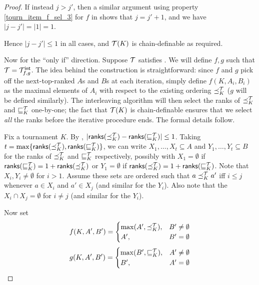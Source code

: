 \begin{proof}
    If instead $j > j'$, then a similar argument using property
    \cref{tourn_item_f_sel_3} for $f$ in  shows
    that $j = j' + 1$, and we have $|j - j'| = |1| = 1$.

    Hence $|j - j'| \le 1$ in all cases, and $\mathcal{T}(K)$ is chain-definable as
    required.

    Now for the ``only if'' direction. Suppose $\mathcal{T}$ satisfies
    \chaindef{}. We will define $f, g$ such that $\mathcal{T} = {\mathcal{T}_{f,g}^\mathsf{int}}$.
    The idea behind the construction is straightforward: since $f$ and $g$ pick
    off the next-top-ranked $A$s and $B$s at each iteration, simply define
    $f(K, A_i, B_i)$ as the maximal elements of $A_i$ with respect to the
    existing ordering ${\preceq_K^{\mathcal{T}}}$ ($g$ will be defined similarly). The
    interleaving algorithm will then select the ranks of ${\preceq_K^{\mathcal{T}}}$ and
    ${\sqsubseteq_K^{\mathcal{T}}}$ one-by-one; the fact that $\mathcal{T}(K)$ is chain-definable
    ensures that we select \emph{all} the ranks before the iterative procedure
    ends. The formal details follow.

    Fix a tournament $K$. By ,
    $|\mathsf{ranks}({{\preceq_K^{\mathcal{T}}}}) - \mathsf{ranks}({{\sqsubseteq_K^{\mathcal{T}}}})| \le 1$. Taking $t =
    \max\{\mathsf{ranks}({{\preceq_K^{\mathcal{T}}}}), \mathsf{ranks}({{\sqsubseteq_K^{\mathcal{T}}}})\}$, we can write $X_1,
    \ldots, X_t \subseteq A$ and $Y_1, \ldots, Y_t \subseteq B$ for the ranks
    of ${\preceq_K^{\mathcal{T}}}$ and ${\sqsubseteq_K^{\mathcal{T}}}$ respectively, possibly with $X_1 =
    \emptyset$ if $\mathsf{ranks}({{\sqsubseteq_K^{\mathcal{T}}}}) = 1 + \mathsf{ranks}({{\preceq_K^{\mathcal{T}}}})$ or $Y_1 =
    \emptyset$ if $\mathsf{ranks}({{\preceq_K^{\mathcal{T}}}}) = 1 + \mathsf{ranks}({{\sqsubseteq_K^{\mathcal{T}}}})$. Note
    that $X_i, Y_i \ne \emptyset$ for $i > 1$. Assume these sets are ordered
    such that $a \preceq_K^{\mathcal{T}} a'$ iff $i \le j$ whenever $a \in X_i$ and $a' \in
    X_j$ (and similar for the $Y_i$). Also note that the $X_i \cap X_j =
    \emptyset$ for $i \ne j$ (and similar for the $Y_i$).

    Now set\footnotemark{}
    \[
        f(K, A', B') = \begin{cases}
           \max(A', {\preceq_K^{\mathcal{T}}}),& B' \ne \emptyset \\
           A',& B' = \emptyset
        \end{cases}
    \]
    \[
        g(K, A', B') = \begin{cases}
            \max(B', {\sqsubseteq_K^{\mathcal{T}}}),& A' \ne \emptyset \\
            B',& A' = \emptyset
        \end{cases}
    \]



\end{proof}

